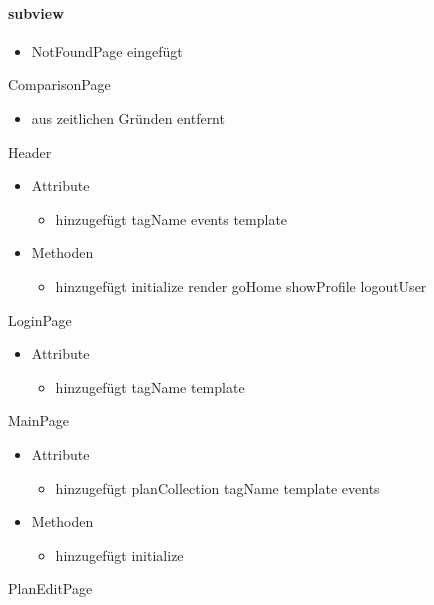 \paragraph{subview}
\begin{itemize}
	\item NotFoundPage eingefügt
\end{itemize}

ComparisonPage
	\begin{itemize}
		\item aus zeitlichen Gründen entfernt
	\end{itemize}
Header
	\begin{itemize}
		\item Attribute		
			\begin{itemize}
				\item hinzugefügt
					\subitem tagName
					\subitem events
					\subitem template
			\end{itemize}
		\item Methoden
			\begin{itemize}
				\item hinzugefügt
					\subitem initialize
					\subitem render
					\subitem goHome
					\subitem showProfile
					\subitem logoutUser
			\end{itemize}
	\end{itemize}
LoginPage
	\begin{itemize}
		\item Attribute
		\begin{itemize}
			\item hinzugefügt
				\subitem tagName
				\subitem template	
		\end{itemize}
	\end{itemize}
MainPage
	\begin{itemize}
		\item Attribute
		\begin{itemize}
			\item hinzugefügt
				\subitem planCollection
				\subitem tagName
				\subitem template
				\subitem events 	
		\end{itemize}
		\item Methoden
		\begin{itemize}
			\item hinzugefügt
				\subitem initialize
		\end{itemize}
	\end{itemize}
PlanEditPage
